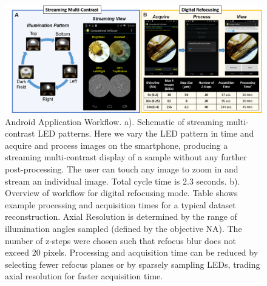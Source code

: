 \begin{figure}
\begin{center}
\includegraphics[width=\textwidth]{figures/fig_ccs_app.png}
\end{center}
\caption {{Android Application Workflow.} {a).} Schematic of streaming multi-contrast LED patterns. Here we vary the LED pattern in time and acquire and process images on the smartphone, producing a streaming multi-contrast display of a sample without any further post-processing. The user can touch any image to zoom in and stream an individual image. Total cycle time is 2.3 seconds.
{b).} Overview of workflow for digital refocusing mode. Table shows example processing and acquisition times for a typical dataset reconstruction. Axial Resolution is determined by the range of illumination angles sampled (defined by the objective NA). The number of z-steps were chosen such that refocus blur does not exceed 20 pixels. Processing and acquisition time can be reduced by selecting fewer refocus planes or by sparsely sampling LEDs, trading axial resolution for faster acquisition time.}

\label{fig:fabrication:android}
\end{figure}

